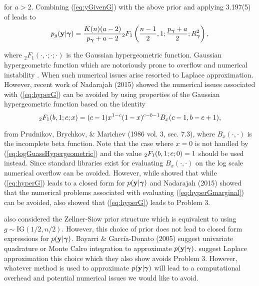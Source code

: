 \documentclass{article}[12pt]
\begin{document}
\noindent for $a>2$. Combining (\ref{eq:yGivenG}) with the above prior and applying 
3.197(5) of \cite{Gradshteyn2007} leads to
\begin{equation}\label{eq:hyperGmarginal}
\displaystyle p_{g}({\bf y}|{\boldsymbol \gamma}) =  \frac{K(n)(a - 2)}{p_{\boldsymbol \gamma} + a - 2} {}_2F_1\left( \frac{n-1}{2}, 1; \frac{p_{\boldsymbol \gamma} + a}{2}; R_{\boldsymbol \gamma}^2 \right),
\end{equation}

\noindent where ${}_2F_1(\cdot,\cdot;\cdot;\cdot)$ is the Gaussian hypergeometric function.
Gaussian hypergeometric function which are notoriously prone 
to overflow and numerical instability \citep{Pearson2014}. When such numerical issues arise 
\cite{Liang2008} resorted to Laplace approximation. However, recent work of Nadarajah 
(2015) showed the numerical issues associated with (\ref{eq:hyperG}) can be avoided by using properties of the 
Gaussian hypergeometric function based on the identity 
\begin{equation}\label{eq:logGuassHypergeometric}
\displaystyle {}_2F_1(b,1;c;x) = (c-1) x^{1-c} (1-x)^{c-b-1} B_x (c-1, b-c+1),
\end{equation}

\noindent from Prudnikov, Brychkov, \& Marichev (1986 vol. 3, sec. 7.3), where $B_x(\cdot,\cdot)$
is the incomplete beta function. Note that the case where $x=0$ is not handled by 
(\ref{eq:logGuassHypergeometric}) and the value $\displaystyle {}_2F_1(b,1;c;0) = 1$ should be used instead.
Since standard libraries exist for evaluating $B_x(\cdot,\cdot)$
on the log scale numerical overflow can be avoided.
However, while \cite{Liang2008} showed that while (\ref{eq:hyperG}) leads to a closed form for 
$p({\bf y}|{\boldsymbol \gamma})$ and Nadarajah (2015) showed that the numerical problems associated with
evaluating (\ref{eq:hyperGmarginal}) can be avoided, \cite{Liang2008} also showed that
(\ref{eq:hyperG}) leads to Problem 3.

\cite{Liang2008} also considered
the Zellner-Siow prior structure \citep{Zellner1980} which is
equivalent to using $g\sim \mbox{IG}(1/2,n/2)$. However, this choice of prior does not
lead to closed form expressions for $p({\bf y}|{\boldsymbol \gamma})$. Bayarri \& Garc\'ia-Donato (2005)
suggest univariate quadrature or Monte Calro integration to approximate $p({\bf y}|{\boldsymbol \gamma})$. \cite{Liang2008} suggest Laplace approximation this choice
which they also show avoids Problem 3. However, whatever method is used to 
approximate $p({\bf y}|{\boldsymbol \gamma})$ will lead to a computational overhead and potential
numerical issues we would like to avoid.
\end{document}
